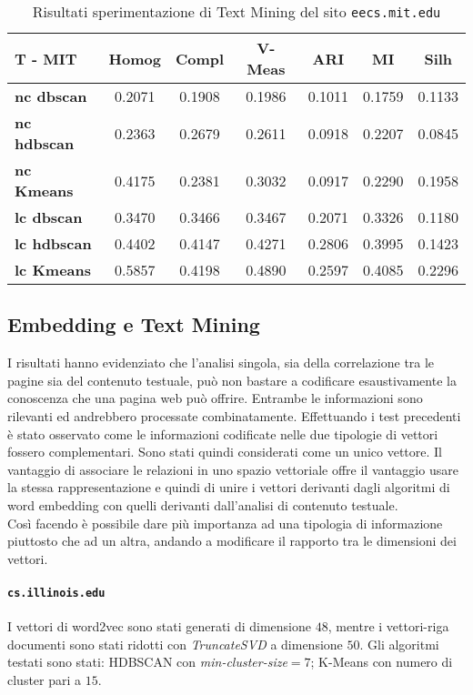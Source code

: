 \begin{table}[H]
	\begin{tabular}{| l | c | c | c | c | c | c |}
	\hline
	\textbf{T - MIT}  & \textbf{Homog} & \textbf{Compl} & \textbf{V-Meas}  & \textbf{ARI}  & \textbf{MI}  & \textbf{Silh} \\ [3ex] \hline
	\textbf{nc dbscan} & 0.2071 & 0.1908 & 0.1986 & 0.1011 & 0.1759 & 0.1133\\ [3ex]
	 \hline 
	\textbf{nc hdbscan} & 0.2363 & 0.2679 & 0.2611 & 0.0918 & 0.2207 & 0.0845\\ [3ex]
	 \hline
	\textbf{nc Kmeans} & 0.4175 & 0.2381 & 0.3032 & 0.0917 & 0.2290 & 0.1958\\ [3ex]
	 \hline	
	\textbf{lc dbscan} & 0.3470 & 0.3466 & 0.3467 & 0.2071 & 0.3326 & 0.1180\\ [3ex]
	\hline
	\textbf{lc hdbscan} & 0.4402 & 0.4147 & 0.4271 & 0.2806 & 0.3995 & 0.1423\\ [3ex]
	\hline
	\textbf{lc Kmeans} & 0.5857 & 0.4198 & 0.4890 & 0.2597 & 0.4085 & 0.2296\\ [3ex]
	\hline
	\end{tabular}
	\caption{Risultati sperimentazione di Text Mining del sito \texttt{eecs.mit.edu}}
	\label{metricheTextMit}
\end{table}


\subsection{Embedding e Text Mining}
I risultati hanno evidenziato che l'analisi singola, sia della correlazione tra le pagine sia del contenuto testuale, può non bastare a codificare esaustivamente la conoscenza che una pagina web può offrire. Entrambe le informazioni sono rilevanti ed andrebbero processate combinatamente. Effettuando i test precedenti è stato osservato come le informazioni codificate nelle due tipologie di vettori fossero complementari. Sono stati quindi considerati come un unico vettore. Il vantaggio di associare le relazioni in uno spazio vettoriale offre il vantaggio usare la stessa rappresentazione e quindi di unire i vettori derivanti dagli algoritmi di word embedding con quelli derivanti dall'analisi di contenuto testuale. 
\\
Così facendo è possibile dare più importanza ad una tipologia di informazione piuttosto che ad un altra, andando a modificare il rapporto tra le dimensioni dei vettori.


\paragraph{\texttt{cs.illinois.edu}} I vettori di word2vec sono stati generati di dimensione $48$, mentre i vettori-riga documenti sono stati ridotti con \textit{TruncateSVD} a dimensione $50$. Gli algoritmi testati sono stati: HDBSCAN con \textit{min-cluster-size}$=7$; K-Means con numero di cluster pari a $15$. 


